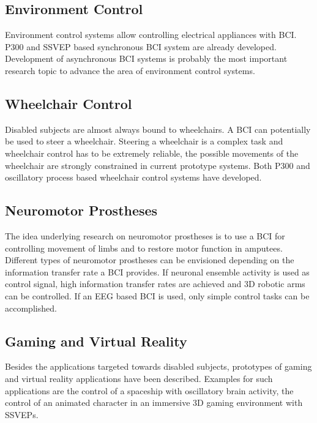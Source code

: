 \subsection{Environment Control} 

Environment control systems allow controlling electrical appliances with BCI. P300 and SSVEP based synchronous BCI system are already developed. Development of asynchronous BCI systems is probably the most important research topic to advance the area of environment control systems.

\subsection{Wheelchair Control} 
Disabled subjects are almost always bound to wheelchairs. A BCI can potentially be used to steer a wheelchair. Steering a wheelchair is a complex task and wheelchair control has to be extremely reliable, the possible movements of the wheelchair are strongly constrained in current prototype systems. Both P300 and oscillatory process based wheelchair control systems have developed.

\subsection{Neuromotor Prostheses}
The idea underlying research on neuromotor prostheses is to use a BCI for controlling movement of limbs and to restore motor function in amputees. Different types of neuromotor prostheses can be envisioned depending on the information transfer rate a BCI provides. If neuronal ensemble activity is used as control signal, high information transfer rates are achieved and 3D robotic arms can be controlled. If an EEG based BCI is used, only simple control tasks can be accomplished.

\subsection{Gaming and Virtual Reality}
Besides the applications targeted towards disabled subjects, prototypes of gaming and virtual reality applications have been described. Examples for such applications are the control of a spaceship with oscillatory brain activity, the control of an animated character in an immersive 3D gaming environment with SSVEPs.



